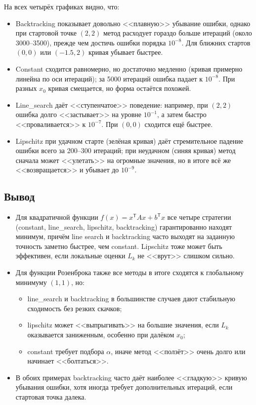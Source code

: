 \documentclass[a4paper,12pt]{article}
\begin{document}
\noindent
На всех четырёх графиках видно, что:
\begin{itemize}
    \item Backtracking показывает довольно <<плавную>> убывание ошибки, однако при стартовой точке $(2,2)$ метод расходует гораздо больше итераций (около 3000--3500), прежде чем достичь ошибки порядка $10^{-8}$. Для ближних стартов $(0,0)$ или $(-1.5,2)$ кривая убывает быстрее.
    \item Constant сходится равномерно, но достаточно медленно (кривая примерно линейна по оси итераций); за 5000 итераций ошибка падает к $10^{-8}$. При разных $x_0$ кривая смещается, но форма остаётся похожей.
    \item Line\_search даёт <<ступенчатое>> поведение: например, при $(2,2)$ ошибка долго <<застывает>> на уровне $10^{-1}$, а затем быстро <<проваливается>> к $10^{-7}$. При $(0,0)$ сходится ещё быстрее.
    \item Lipschitz при удачном старте (зелёная кривая) даёт стремительное падение ошибки всего за 200--300 итераций; при неудачном (синяя кривая) метод сначала может <<улетать>> на огромные значения, но в итоге всё же <<возвращается>> и убывает до $10^{-9}$.
\end{itemize}

\subsection{Вывод}
\begin{itemize}
    \item Для квадратичной функции $f(x)=x^\mathsf{T}Ax + b^\mathsf{T}x$ все четыре стратегии (constant, line\_search, lipschitz, backtracking) гарантированно находят минимум, причём line search и backtracking часто выходят на заданную точность заметно быстрее, чем constant. Lipschitz тоже может быть эффективен, если локальные оценки $L_k$ не <<врут>> слишком сильно.
    \item Для функции Розенброка также все методы в итоге сходятся к глобальному минимуму $(1,1)$, но:
    \begin{itemize}
        \item line\_search и backtracking в большинстве случаев дают стабильную сходимость без резких скачков;
        \item lipschitz может <<выпрыгивать>> на большие значения, если $L_k$ оказывается заниженным, особенно при далёком $x_0$;
        \item constant требует подбора $\alpha$, иначе метод <<ползёт>> очень долго или начинает <<болтаться>>.
    \end{itemize}
    \item В обоих примерах backtracking часто даёт наиболее <<гладкую>> кривую убывания ошибки, хотя иногда требует дополнительных итераций, если стартовая точка далека.
\end{itemize}
\end{document}
